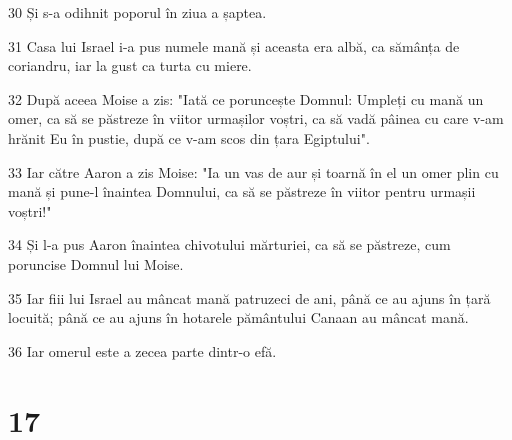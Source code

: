 \par 30 Și s-a odihnit poporul în ziua a șaptea.
\par 31 Casa lui Israel i-a pus numele mană și aceasta era albă, ca sămânța de coriandru, iar la gust ca turta cu miere.
\par 32 După aceea Moise a zis: "Iată ce poruncește Domnul: Umpleți cu mană un omer, ca să se păstreze în viitor urmașilor voștri, ca să vadă pâinea cu care v-am hrănit Eu în pustie, după ce v-am scos din țara Egiptului".
\par 33 Iar către Aaron a zis Moise: "Ia un vas de aur și toarnă în el un omer plin cu mană și pune-l înaintea Domnului, ca să se păstreze în viitor pentru urmașii voștri!"
\par 34 Și l-a pus Aaron înaintea chivotului mărturiei, ca să se păstreze, cum poruncise Domnul lui Moise.
\par 35 Iar fiii lui Israel au mâncat mană patruzeci de ani, până ce au ajuns în țară locuită; până ce au ajuns în hotarele pământului Canaan au mâncat mană.
\par 36 Iar omerul este a zecea parte dintr-o efă.

\chapter{17}

